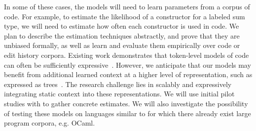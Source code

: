 In some of these cases, the models will need to learn parameters from a corpus
of code. For example, to estimate the likelihood of a constructor for a labeled
sum type, we will need to estimate how often each constructor is used in
code. We plan to describe the estimation techniques abstractly, and prove that
they are unbiased formally, as well as learn and evaluate them empirically over code or edit
history corpora.  Existing work demonstrates that token-level models of code can
often be sufficiently
expressive~\cite{buggy-naturalness-icse16,icse-naturalness12}. However, we
anticipate that our models may benefit from additional learned context at a
higher level of representation, such as expressed as
trees~\cite{changedistiller,probabilistic-cfgs}.  The research challenge lies in
scalably and expressively integrating static context into these
representations. We will use initial pilot studies with 
\HazelEnv to gather concrete estimates. We will also investigate the possibility
of testing these models on languages similar to \HazelEnv for which there
already exist large program corpora, e.g. OCaml.

